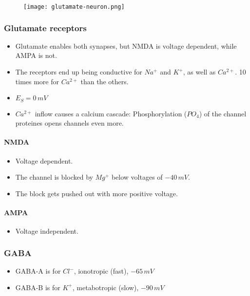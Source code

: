\documentclass[main]{subfiles}
\begin{document}
\begin{figure}[H]
	\centering
 	\texttt{[image: glutamate-neuron.png]}
\end{figure} 

\subsubsection{Glutamate receptors}
\begin{itemize}[noitemsep,nolistsep]
	\item Glutamate enables both synapses, but NMDA is voltage dependent, while AMPA is not.
	\item The receptors end up being conductive for $Na^+$ and $K^+$, as well as $Ca^{2+}$. 10 times more for $Ca^{2+}$ than the others.
	\item $E_S = 0\,mV$
	\item $Ca^{2+}$ inflow causes a calcium cascade: Phosphorylation ($PO_4$) of the channel proteines opens channels even more.
\end{itemize}

\paragraph{NMDA}
\begin{itemize}[noitemsep,nolistsep]
	\item Voltage dependent.
	\item The channel is blocked by $Mg^+$ below voltages of $-40\,mV$.
	\item The block gets pushed out with more positive voltage.
\end{itemize}

\paragraph{AMPA}
\begin{itemize}[noitemsep,nolistsep]
	\item Voltage independent.
\end{itemize}

\subsubsection{GABA}
\begin{itemize}[noitemsep,nolistsep]
	\item GABA-A is for $Cl^-$, ionotropic (fast), $-65\,mV$
	\item GABA-B is for $K^+$, metabotropic (slow), $-90\,mV$
\end{itemize}
\end{document}
